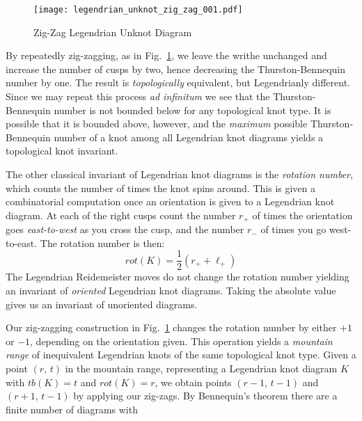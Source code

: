     \begin{figure}
        \centering
        \texttt{[image: legendrian\_unknot\_zig\_zag\_001.pdf]}
        \caption{Zig-Zag Legendrian Unknot Diagram}
        \label{fig:legendrian_unknot_zig_zag_001}
    \end{figure}
    By repeatedly zig-zagging, as in
    Fig.~\ref{fig:legendrian_unknot_zig_zag_001}, we leave the writhe unchanged
    and increase the number of cusps by two, hence decreasing the
    Thurston-Bennequin number by one. The result is \textit{topologically}
    equivalent, but Legendrianly different. Since we may repeat this process
    \textit{ad infinitum} we see that the Thurston-Bennequin number is not
    bounded below for any topological knot type. It is possible that it is
    bounded above, however, and the \textit{maximum} possible
    Thurston-Bennequin number of a knot among all Legendrian knot diagrams
    yields a topological knot invariant.
    \par\hfill\par
    The other classical invariant of Legendrian knot diagrams is the
    \textit{rotation number}, which counts the number of times the knot spins
    around. This is given a combinatorial computation once an orientation is
    given to a Legendrian knot diagram. At each of the right cusps count the
    number $r_{+}$ of times the orientation goes \textit{east-to-west} as you
    cross the cusp, and the number $r_{-}$ of times you go west-to-east.
    The rotation number is then:
    \begin{equation}
        rot(K)=\frac{1}{2}(r_{+}+\ell_{+})
    \end{equation}
    The Legendrian Reidemeister moves do not change the rotation number yielding
    an invariant of \textit{oriented} Legendrian knot diagrams. Taking the
    absolute value gives us an invariant of unoriented diagrams.
    \par\hfill\par
    Our zig-zagging construction in Fig.~\ref{fig:legendrian_unknot_zig_zag_001}
    changes the rotation number by either $+1$ or $-1$, depending on the
    orientation given. This operation yields a \textit{mountain range} of
    inequivalent Legendrian knots of the same topological knot type. Given
    a point $(r,\,t)$ in the mountain range, representing a Legendrian knot
    diagram $K$ with $tb(K)=t$ and $rot(K)=r$, we obtain points
    $(r-1,\,t-1)$ and $(r+1,\,t-1)$ by applying our zig-zags. By
    Bennequin's theorem there are a finite number of diagrams with
